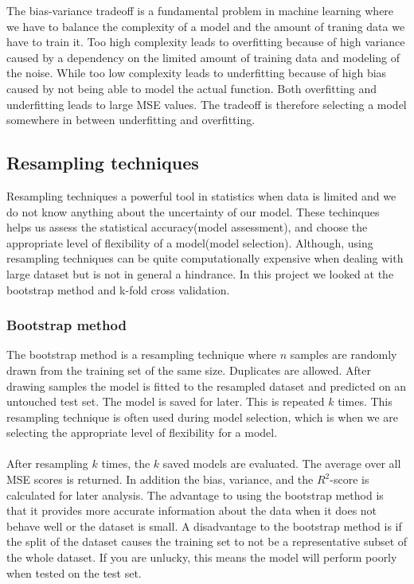 \documentclass[a4paper,twocolumn]{article}
\begin{document}
The bias-variance tradeoff is a fundamental problem in machine learning where we have to balance the complexity of a model and the amount of traning data we have to train it. Too high complexity leads to overfitting because of high variance caused by a dependency on the limited amount of training data and modeling of the noise. While too low complexity leads to underfitting because of high bias caused by not being able to model the actual function. Both overfitting and underfitting leads to large MSE values. The tradeoff is therefore selecting a model somewhere in between underfitting and overfitting.
\subsection{Resampling techniques}
Resampling techniques a powerful tool in statistics when data is limited and we do not know anything about the uncertainty of our model. These techinques helps us assess the statistical accuracy(model assessment), and choose the appropriate level of flexibility of a model(model selection). Although, using resampling techniques can be quite computationally expensive when dealing with large dataset but is not in general a hindrance. In this project we looked at the bootstrap method and k-fold cross validation.
\subsubsection{Bootstrap method}
The bootstrap method is a resampling technique where $n$ samples are randomly drawn from the training set of the same size. Duplicates are allowed. After drawing samples the model is fitted to the resampled dataset and predicted on an untouched test set. The model is saved for later. This is repeated $k$ times. This resampling technique is often used during model selection, which is when we are selecting the appropriate level of flexibility for a model.\\
\\
After resampling $k$ times, the $k$ saved models are evaluated. The average over all MSE scores is returned. In addition the bias, variance, and the $R^{2}$-score is calculated for later analysis. The advantage to using the bootstrap method is that it provides more accurate information about the data when it does not behave well or the dataset is small. A disadvantage to the bootstrap method is if the split of the dataset causes the training set to not be a representative subset of the whole dataset. If you are unlucky, this means the model will perform poorly when tested on the test set.
\end{document}

